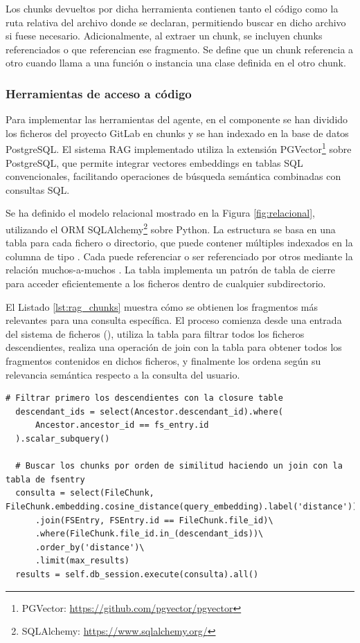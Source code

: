Los chunks devueltos por dicha herramienta contienen tanto el código como la ruta relativa del archivo donde se declaran, permitiendo buscar en dicho archivo si fuese necesario. Adicionalmente, al extraer un chunk, se incluyen chunks referenciados o que referencian ese fragmento. Se define que un chunk referencia a otro cuando llama a una función o instancia una clase definida en el otro chunk. 

\subsubsection{Herramientas de acceso a código}
Para implementar las herramientas del agente, en el componente  se han dividido los ficheros del proyecto GitLab en chunks y se han indexado en la base de datos PostgreSQL. El sistema RAG implementado utiliza la extensión PGVector\footnote{PGVector: \url{https://github.com/pgvector/pgvector}} sobre PostgreSQL, que permite integrar vectores embeddings en tablas SQL convencionales, facilitando operaciones de búsqueda semántica combinadas con consultas SQL. 

Se ha definido el modelo relacional mostrado en la Figura \ref{fig:relacional}, utilizando el ORM SQLAlchemy\footnote{SQLAlchemy: \url{https://www.sqlalchemy.org/}} sobre Python. La estructura se basa en una tabla  para cada fichero o directorio, que puede contener múltiples  indexados en la columna  de tipo . Cada  puede referenciar o ser referenciado por otros  mediante la relación muchos-a-muchos . La tabla  implementa un patrón de tabla de cierre para acceder eficientemente a los ficheros dentro de cualquier subdirectorio.

El Listado \ref{lst:rag_chunks} muestra cómo se obtienen los fragmentos más relevantes para una consulta específica. El proceso comienza desde una entrada del sistema de ficheros (), utiliza la tabla  para filtrar todos los ficheros descendientes, realiza una operación de join con la tabla  para obtener todos los fragmentos contenidos en dichos ficheros, y finalmente los ordena según su relevancia semántica respecto a la consulta del usuario.

\begin{lstlisting}[caption={Obtener chunks relevantes para una consulta dentro de un subdirectorio específico}, label={lst:rag_chunks}]
  # Filtrar primero los descendientes con la closure table
  descendant_ids = select(Ancestor.descendant_id).where(
      Ancestor.ancestor_id == fs_entry.id
  ).scalar_subquery()

  # Buscar los chunks por orden de similitud haciendo un join con la tabla de fsentry
  consulta = select(FileChunk, FileChunk.embedding.cosine_distance(query_embedding).label('distance'))\
      .join(FSEntry, FSEntry.id == FileChunk.file_id)\
      .where(FileChunk.file_id.in_(descendant_ids))\
      .order_by('distance')\
      .limit(max_results)
  results = self.db_session.execute(consulta).all()
\end{lstlisting}


